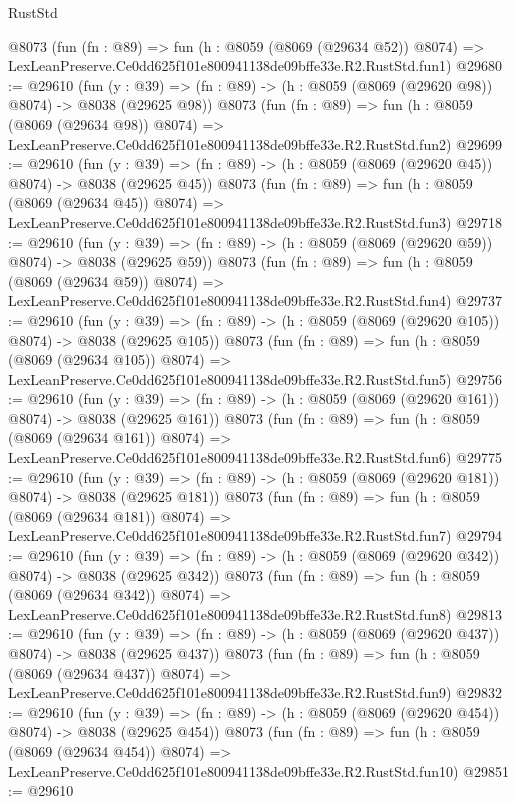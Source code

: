 \begin{lexlean}{RustStd}
\begin{coremodule}
    @8073
    (fun (fn : @89) =>
    fun (h : @8059 (@8069 (@29634 @52)) @8074) =>
    LexLeanPreserve.Ce0dd625f101e800941138de09bffe33e.R2.RustStd.fun1)
@29680 := @29610
    (fun (y : @39) => (fn : @89) -> (h : @8059 (@8069 (@29620 @98)) @8074) -> @8038 (@29625 @98))
    @8073
    (fun (fn : @89) =>
    fun (h : @8059 (@8069 (@29634 @98)) @8074) =>
    LexLeanPreserve.Ce0dd625f101e800941138de09bffe33e.R2.RustStd.fun2)
@29699 := @29610
    (fun (y : @39) => (fn : @89) -> (h : @8059 (@8069 (@29620 @45)) @8074) -> @8038 (@29625 @45))
    @8073
    (fun (fn : @89) =>
    fun (h : @8059 (@8069 (@29634 @45)) @8074) =>
    LexLeanPreserve.Ce0dd625f101e800941138de09bffe33e.R2.RustStd.fun3)
@29718 := @29610
    (fun (y : @39) => (fn : @89) -> (h : @8059 (@8069 (@29620 @59)) @8074) -> @8038 (@29625 @59))
    @8073
    (fun (fn : @89) =>
    fun (h : @8059 (@8069 (@29634 @59)) @8074) =>
    LexLeanPreserve.Ce0dd625f101e800941138de09bffe33e.R2.RustStd.fun4)
@29737 := @29610
    (fun (y : @39) => (fn : @89) -> (h : @8059 (@8069 (@29620 @105)) @8074) -> @8038 (@29625 @105))
    @8073
    (fun (fn : @89) =>
    fun (h : @8059 (@8069 (@29634 @105)) @8074) =>
    LexLeanPreserve.Ce0dd625f101e800941138de09bffe33e.R2.RustStd.fun5)
@29756 := @29610
    (fun (y : @39) => (fn : @89) -> (h : @8059 (@8069 (@29620 @161)) @8074) -> @8038 (@29625 @161))
    @8073
    (fun (fn : @89) =>
    fun (h : @8059 (@8069 (@29634 @161)) @8074) =>
    LexLeanPreserve.Ce0dd625f101e800941138de09bffe33e.R2.RustStd.fun6)
@29775 := @29610
    (fun (y : @39) => (fn : @89) -> (h : @8059 (@8069 (@29620 @181)) @8074) -> @8038 (@29625 @181))
    @8073
    (fun (fn : @89) =>
    fun (h : @8059 (@8069 (@29634 @181)) @8074) =>
    LexLeanPreserve.Ce0dd625f101e800941138de09bffe33e.R2.RustStd.fun7)
@29794 := @29610
    (fun (y : @39) => (fn : @89) -> (h : @8059 (@8069 (@29620 @342)) @8074) -> @8038 (@29625 @342))
    @8073
    (fun (fn : @89) =>
    fun (h : @8059 (@8069 (@29634 @342)) @8074) =>
    LexLeanPreserve.Ce0dd625f101e800941138de09bffe33e.R2.RustStd.fun8)
@29813 := @29610
    (fun (y : @39) => (fn : @89) -> (h : @8059 (@8069 (@29620 @437)) @8074) -> @8038 (@29625 @437))
    @8073
    (fun (fn : @89) =>
    fun (h : @8059 (@8069 (@29634 @437)) @8074) =>
    LexLeanPreserve.Ce0dd625f101e800941138de09bffe33e.R2.RustStd.fun9)
@29832 := @29610
    (fun (y : @39) => (fn : @89) -> (h : @8059 (@8069 (@29620 @454)) @8074) -> @8038 (@29625 @454))
    @8073
    (fun (fn : @89) =>
    fun (h : @8059 (@8069 (@29634 @454)) @8074) =>
    LexLeanPreserve.Ce0dd625f101e800941138de09bffe33e.R2.RustStd.fun10)
@29851 := @29610

\end{coremodule}
\end{lexlean}
